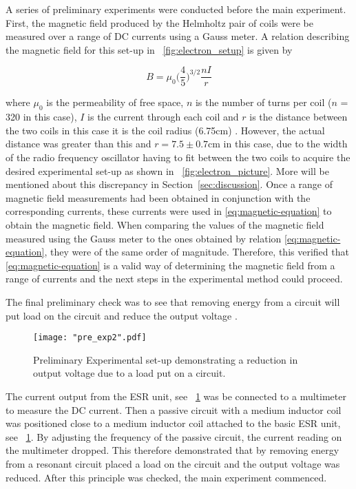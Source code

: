 \documentclass{article}
\newcommand{\figref}[2][\figurename~]{#1\ref{#2}}
\newcommand{\secref}[2][Section~]{#1\ref{#2}}
\begin{document}
\vspace{2mm}
\noindent
A series of preliminary experiments were conducted before the main experiment. First, the magnetic field produced by the Helmholtz pair of coils were be measured over a range of DC currents using a Gauss meter. A relation describing the magnetic field for this set-up in \figref{fig:electron_setup} is given by

\begin{equation}
\label{eq:magnetic-equation}
B = \mu_0\Bigg(\frac{4}{5}\Bigg)^{3/2}\frac{nI}{r}
\end{equation}

\vspace{2mm}
\noindent
where $\mu_0$ is the permeability of free space, $n$ is the number of turns per coil ($n$ = 320 in this case), $I$ is the current through each coil and $r$ is the distance between the two coils in this case it is the coil radius (6.75cm) \cite{Paper02}. However, the actual distance was greater than this and $r = 7.5 \pm 0.7$cm in this case, due to the width of the radio frequency oscillator having to fit between the two coils to acquire the desired experimental set-up as shown in \figref{fig:electron_picture}. More will be mentioned about this discrepancy in \secref{sec:discussion}. Once a range of magnetic field measurements had been obtained in conjunction with the corresponding currents, these currents were used in \eqref{eq:magnetic-equation} to obtain the magnetic field. When comparing the values of the magnetic field measured using the Gauss meter to the ones obtained by relation \eqref{eq:magnetic-equation}, they were of the same order of magnitude. Therefore, this verified that \eqref{eq:magnetic-equation} is a valid way of determining the magnetic field from a range of currents and the next steps in the experimental method could proceed.

\vspace{2mm}
\noindent
The final preliminary check was to see that removing energy from a circuit will put load on the circuit and reduce the output voltage \cite{Paper02}.

\begin{figure}[h]
\centering
\texttt{[image: "pre\_exp2".pdf]}
\caption{Preliminary Experimental set-up demonstrating a reduction in output voltage due to a load put on a circuit.}
\label{fig:pre_exp2}
\end{figure}


\vspace{2mm}
\noindent
The current output from the ESR unit, see \figref{fig:pre_exp2} was be connected to a multimeter to measure the DC current. Then a passive circuit with a medium inductor coil was positioned close to a medium inductor coil attached to the basic ESR unit, see \figref{fig:pre_exp2}. By adjusting the frequency of the passive circuit, the current reading on the multimeter dropped. This therefore demonstrated that by removing energy from a resonant circuit placed a load on the circuit and the output voltage was reduced. After this principle was checked, the main experiment commenced.
\end{document}
